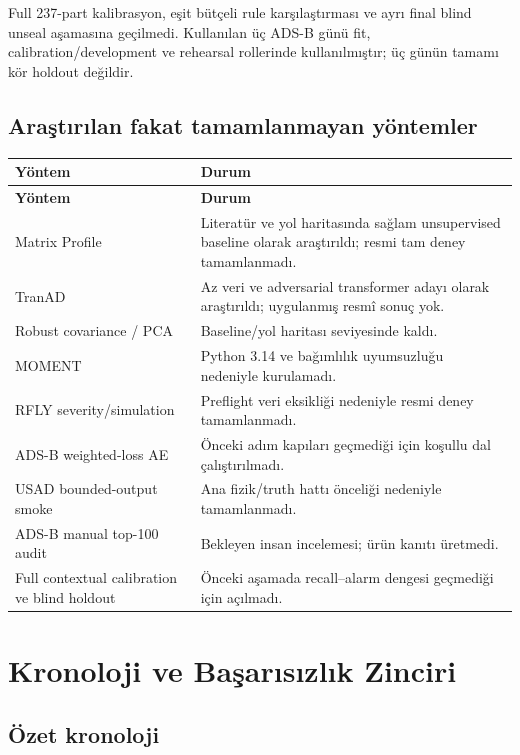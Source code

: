 \documentclass[11pt,a4paper,oneside]{report}
\begin{document}
Full 237-part kalibrasyon, eşit bütçeli rule karşılaştırması ve ayrı final
blind unseal aşamasına geçilmedi. Kullanılan üç ADS-B günü fit,
calibration/development ve rehearsal rollerinde kullanılmıştır; üç günün
tamamı kör holdout değildir.

\section{Araştırılan fakat tamamlanmayan yöntemler}

\begin{longtable}{L{0.25\textwidth}L{0.61\textwidth}}
\toprule
\textbf{Yöntem} & \textbf{Durum}\\
\midrule
\endfirsthead
\toprule
\textbf{Yöntem} & \textbf{Durum}\\
\midrule
\endhead
Matrix Profile & Literatür ve yol haritasında sağlam unsupervised baseline olarak araştırıldı; resmi tam deney tamamlanmadı.\\
TranAD & Az veri ve adversarial transformer adayı olarak araştırıldı; uygulanmış resmî sonuç yok.\\
Robust covariance / PCA & Baseline/yol haritası seviyesinde kaldı.\\
MOMENT & Python 3.14 ve bağımlılık uyumsuzluğu nedeniyle kurulamadı.\\
RFLY severity/simulation & Preflight veri eksikliği nedeniyle resmi deney tamamlanmadı.\\
ADS-B weighted-loss AE & Önceki adım kapıları geçmediği için koşullu dal çalıştırılmadı.\\
USAD bounded-output smoke & Ana fizik/truth hattı önceliği nedeniyle tamamlanmadı.\\
ADS-B manual top-100 audit & Bekleyen insan incelemesi; ürün kanıtı üretmedi.\\
Full contextual calibration ve blind holdout & Önceki aşamada recall--alarm dengesi geçmediği için açılmadı.\\
\bottomrule
\end{longtable}

\chapter{Kronoloji ve Başarısızlık Zinciri}

\section{Özet kronoloji}
\end{document}
